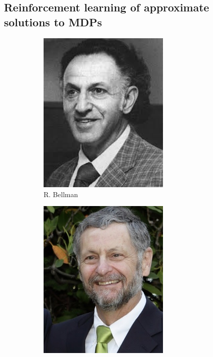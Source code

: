 \subsection{Reinforcement learning of approximate solutions to MDPs}
\begin{figure}
    \centering
    \begin{subfigure}[b]{0.22\textwidth}
        \centering
        \includegraphics[width=0.7\textwidth]{images/images_intro/bellman.jpeg}
        \caption{R. Bellman}
    \end{subfigure}
    \hfill
    \begin{subfigure}[b]{0.22\textwidth}
        \centering
        \includegraphics[width=0.7\textwidth]{images/images_intro/puterman.jpg}

\end{subfigure}
\end{figure}
